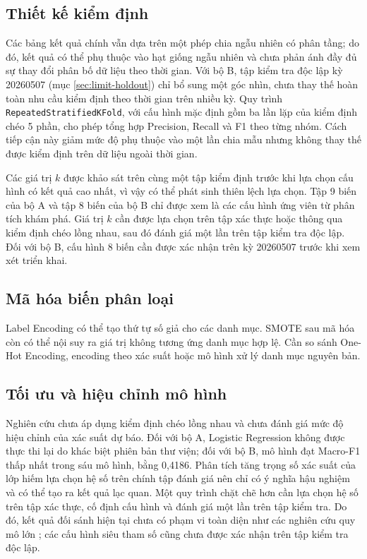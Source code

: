 \subsection{Thiết kế kiểm định}

Các bảng kết quả chính vẫn dựa trên một phép chia ngẫu nhiên có phân tầng; do đó, kết quả có thể phụ thuộc vào hạt giống ngẫu nhiên và chưa phản ánh đầy đủ sự thay đổi phân bố dữ liệu theo thời gian. Với bộ B, tập kiểm tra độc lập kỳ 20260507 (mục \ref{sec:limit-holdout}) chỉ bổ sung một góc nhìn, chưa thay thế hoàn toàn nhu cầu kiểm định theo thời gian trên nhiều kỳ. Quy trình \mbox{\texttt{RepeatedStratifiedKFold}}, với cấu hình mặc định gồm ba lần lặp của kiểm định chéo 5 phần, cho phép tổng hợp Precision, Recall và F1 theo từng nhóm. Cách tiếp cận này giảm mức độ phụ thuộc vào một lần chia mẫu nhưng không thay thế được kiểm định trên dữ liệu ngoài thời gian.

Các giá trị $k$ được khảo sát trên cùng một tập kiểm định trước khi lựa chọn cấu hình có kết quả cao nhất, vì vậy có thể phát sinh thiên lệch lựa chọn. Tập 9 biến của bộ A và tập 8 biến của bộ B chỉ được xem là các cấu hình ứng viên từ phân tích khám phá. Giá trị $k$ cần được lựa chọn trên tập xác thực hoặc thông qua kiểm định chéo lồng nhau, sau đó đánh giá một lần trên tập kiểm tra độc lập. Đối với bộ B, cấu hình 8 biến cần được xác nhận trên kỳ 20260507 trước khi xem xét triển khai.

\subsection{Mã hóa biến phân loại}

Label Encoding có thể tạo thứ tự số giả cho các danh mục. SMOTE sau mã hóa còn có thể nội suy ra giá trị không tương ứng danh mục hợp lệ. Cần so sánh One-Hot Encoding, encoding theo xác suất hoặc mô hình xử lý danh mục nguyên bản.

\subsection{Tối ưu và hiệu chỉnh mô hình}

Nghiên cứu chưa áp dụng kiểm định chéo lồng nhau và chưa đánh giá mức độ hiệu chỉnh của xác suất dự báo. Đối với bộ A, Logistic Regression không được thực thi lại do khác biệt phiên bản thư viện; đối với bộ B, mô hình đạt Macro-F1 thấp nhất trong sáu mô hình, bằng 0,4186. Phân tích tăng trọng số xác suất của lớp hiếm lựa chọn hệ số trên chính tập đánh giá nên chỉ có ý nghĩa hậu nghiệm và có thể tạo ra kết quả lạc quan. Một quy trình chặt chẽ hơn cần lựa chọn hệ số trên tập xác thực, cố định cấu hình và đánh giá một lần trên tập kiểm tra. Do đó, kết quả đối sánh hiện tại chưa có phạm vi toàn diện như các nghiên cứu quy mô lớn \cite{lessmann2015benchmarking}; các cấu hình siêu tham số cũng chưa được xác nhận trên tập kiểm tra độc lập.

